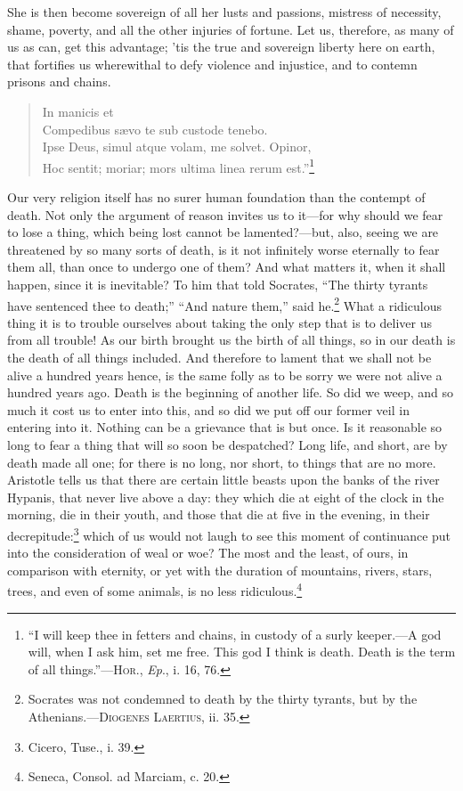 \noindent She is then become sovereign of all her lusts and passions,
mistress of necessity, shame, poverty, and all the other injuries of
fortune. Let us, therefore, as many of us as can, get this advantage;
'tis the true and sovereign liberty here on earth, that fortifies us
wherewithal to defy violence and injustice, and to contemn prisons and
chains.

\begin{verse}
\vin {}In manicis et\\
Compedibus s\ae vo te sub custode tenebo.\\
Ipse Deus, simul atque volam, me solvet. Opinor,\\
Hoc sentit; moriar; mors ultima linea rerum est.''\footnote{``I will
keep thee in fetters and chains, in custody of a surly keeper.---A god
will, when I ask him, set me free. This god I think is death. Death is
the term of all things.''---\textsc{Hor}., \textit{Ep}., i. 16, 76.}
\end{verse}

Our very religion itself has no surer human foundation than the
contempt of death. Not only the argument of reason invites us to
it---for why should we fear to lose a thing, which being lost cannot be
lamented?---but, also, seeing we are threatened by so many sorts of
death, is it not infinitely worse eternally to fear them all, than
once to undergo one of them? And what matters it, when it shall
happen, since it is inevitable? To him that told Socrates, ``The
thirty tyrants have sentenced thee to death;'' ``And nature them,''
said he.\footnote{Socrates was not condemned to death by the thirty
tyrants, but by the A\-the\-ni\-ans.---\textsc{Diogenes Laertius}, ii.
35.} What a ridiculous thing it is to trouble ourselves about taking
the only step that is to deliver us from all trouble! As our birth
brought us the birth of all things, so in our death is the death of
all things included. And therefore to lament that we shall not be
alive a hundred years hence, is the same folly as to be sorry we were
not alive a hundred years ago. Death is the beginning of another life.
So did we weep, and so much it cost us to enter into this, and so did
we put off our former veil in entering into it. Nothing can be a
grievance that is but once. Is it reasonable so long to fear a thing
that will so soon be despatched? Long life, and short, are by death
made all one; for there is no long, nor short, to things that are no
more. Aristotle tells us that there are certain little beasts upon the
banks of the river Hypanis, that never live above a day: they which
die at eight of the clock in the morning, die in their youth, and
those that die at five in the evening, in their
decrepitude:\footnote{Cicero, Tuse., i. 39.} which of us would not
laugh to see this moment of continuance put into the consideration of
weal or woe? The most and the least, of ours, in comparison with
eternity, or yet with the duration of mountains, rivers, stars, trees,
and even of some animals, is no less ridiculous.\footnote{Seneca,
Consol. ad Marciam, c. 20.}

